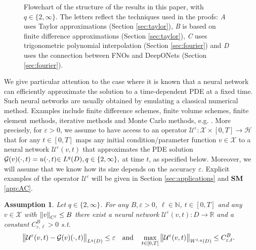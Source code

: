 \documentclass{article}
\numberwithin{equation}{section}
\newcommand{\R}{\mathbb{R}}
\newcommand{\N}{\mathbb{N}}
\newcommand{\cG}{\mathcal{G}}
\newcommand{\cH}{\mathcal{H}}
\newcommand{\cU}{\mathcal{U}}
\newcommand{\cX}{\mathcal{X}}
\renewcommand{\epsilon}{\varepsilon}
\newcommand{\1}{\mathbbm{1}}
\newtheorem{assumption}[theorem]{Assumption}
\begin{document}
\begin{figure}
\begin{center}
\end{center}
    \caption{Flowchart of the structure of the results in this paper, with $q\in\{2,\infty\}$. The letters reflect the techniques used in the proofs: \emph{A} uses Taylor approximations (Section \ref{sec:taylor}), \emph{B} is based on finite difference approximations (Section \ref{sec:taylor}), \emph{C} uses trigonometric polynomial interpolation (Section \ref{sec:fourier}) and \emph{D} uses the connection between FNOs and DeepONets (Section \ref{sec:fourier}). }
    \label{fig:flowchart}
\end{figure}

We give particular attention to the case where it is known that a neural network can efficiently approximate the solution to a time-dependent PDE at a fixed time. Such neural networks are usually obtained by emulating a classical numerical method. Examples include finite difference schemes, finite volume schemes, finite element methods, iterative methods and Monte Carlo methods, e.g. {\color{black} \cite{jentzen2018proof,opschoor2020deep,chen2021representation,marwah2021parametric}}.
More precisely, for $\epsilon>0$, we assume to have access to an operator {\color{black}$\cU^\epsilon:\cX\times [0,T]\to \cH$} that for any $t\in[0,T]$ maps any initial condition/parameter function $v\in \cX$ to a neural network $\cU^\epsilon(v,t)$ that approximates the PDE solution $\cG(v)(\cdot, t) = u(\cdot, t) {\color{black}\in L^q(D), q\in\{2,\infty\},}$ at time $t$, as specified below. Moreover, we will assume that we know how its size depends on the accuracy $\epsilon$. Explicit examples of the operator $\cU^\epsilon$ will be given in Section \ref{sec:applications} and \textbf{SM} \ref{app:AC}.

\begin{assumption}\label{ass:nn}
Let $q\in\{2,\infty\}$. For any $B,\epsilon>0$, $\ell \in\N$, $t\in [0,T]$ and any $v\in \cX$ with $\norm{v}_{C^\ell}\leq B$ there exist a neural network $\cU^\epsilon(v,t):D\to\R$ and a constant $C_{\epsilon,\ell}^B>0$ s.t.
\begin{equation}
    \norm{\cU^\epsilon(v,t)-\cG(v)(\cdot,t)}_{L^q(D)} \leq \epsilon \quad \text{and} \quad \max_{t\in [0,T]} \norm{\cU^\epsilon(v,t)}_{W^{\ell,q}(D)} \leq C_{\epsilon,\ell}^B.
\end{equation}
\end{assumption}
\end{document}
